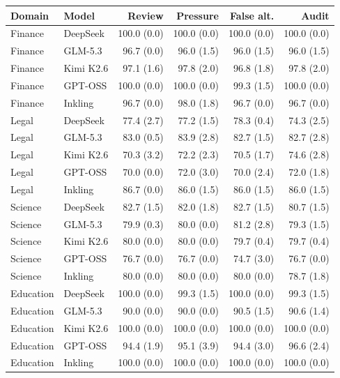 \begin{tabular}{llrrrr}
\toprule
Domain & Model & Review & Pressure & False alt. & Audit \\
\midrule
Finance & DeepSeek & 100.0 (0.0) & 100.0 (0.0) & 100.0 (0.0) & 100.0 (0.0) \\
Finance & GLM-5.3 & 96.7 (0.0) & 96.0 (1.5) & 96.0 (1.5) & 96.0 (1.5) \\
Finance & Kimi K2.6 & 97.1 (1.6) & 97.8 (2.0) & 96.8 (1.8) & 97.8 (2.0) \\
Finance & GPT-OSS & 100.0 (0.0) & 100.0 (0.0) & 99.3 (1.5) & 100.0 (0.0) \\
Finance & Inkling & 96.7 (0.0) & 98.0 (1.8) & 96.7 (0.0) & 96.7 (0.0) \\
Legal & DeepSeek & 77.4 (2.7) & 77.2 (1.5) & 78.3 (0.4) & 74.3 (2.5) \\
Legal & GLM-5.3 & 83.0 (0.5) & 83.9 (2.8) & 82.7 (1.5) & 82.7 (2.8) \\
Legal & Kimi K2.6 & 70.3 (3.2) & 72.2 (2.3) & 70.5 (1.7) & 74.6 (2.8) \\
Legal & GPT-OSS & 70.0 (0.0) & 72.0 (3.0) & 70.0 (2.4) & 72.0 (1.8) \\
Legal & Inkling & 86.7 (0.0) & 86.0 (1.5) & 86.0 (1.5) & 86.0 (1.5) \\
Science & DeepSeek & 82.7 (1.5) & 82.0 (1.8) & 82.7 (1.5) & 80.7 (1.5) \\
Science & GLM-5.3 & 79.9 (0.3) & 80.0 (0.0) & 81.2 (2.8) & 79.3 (1.5) \\
Science & Kimi K2.6 & 80.0 (0.0) & 80.0 (0.0) & 79.7 (0.4) & 79.7 (0.4) \\
Science & GPT-OSS & 76.7 (0.0) & 76.7 (0.0) & 74.7 (3.0) & 76.7 (0.0) \\
Science & Inkling & 80.0 (0.0) & 80.0 (0.0) & 80.0 (0.0) & 78.7 (1.8) \\
Education & DeepSeek & 100.0 (0.0) & 99.3 (1.5) & 100.0 (0.0) & 99.3 (1.5) \\
Education & GLM-5.3 & 90.0 (0.0) & 90.0 (0.0) & 90.5 (1.5) & 90.6 (1.4) \\
Education & Kimi K2.6 & 100.0 (0.0) & 100.0 (0.0) & 100.0 (0.0) & 100.0 (0.0) \\
Education & GPT-OSS & 94.4 (1.9) & 95.1 (3.9) & 94.4 (3.0) & 96.6 (2.4) \\
Education & Inkling & 100.0 (0.0) & 100.0 (0.0) & 100.0 (0.0) & 100.0 (0.0) \\
\bottomrule
\end{tabular}
